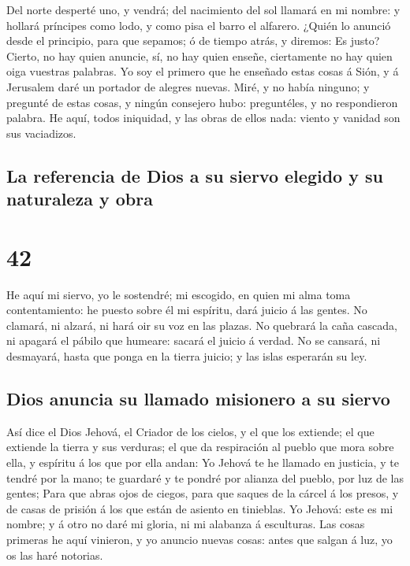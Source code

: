  Del norte desperté uno, y vendrá; del nacimiento del sol
llamará en mi nombre: y hollará príncipes como lodo, y como pisa el
barro el alfarero.  ¿Quién lo anunció desde el principio,
para que sepamos; ó de tiempo atrás, y diremos: Es justo? Cierto, no hay
quien anuncie, sí, no hay quien enseñe, ciertamente no hay quien oiga
vuestras palabras.  Yo soy el primero que he enseñado
estas cosas á Sión, y á Jerusalem daré un portador de alegres nuevas.
 Miré, y no había ninguno; y pregunté de estas cosas, y
ningún consejero hubo: preguntéles, y no respondieron palabra.
 He aquí, todos iniquidad, y las obras de ellos nada:
viento y vanidad son sus vaciadizos.

\hypertarget{la-referencia-de-dios-a-su-siervo-elegido-y-su-naturaleza-y-obra}{%
\subsection{La referencia de Dios a su siervo elegido y su naturaleza y
obra}\label{la-referencia-de-dios-a-su-siervo-elegido-y-su-naturaleza-y-obra}}

\hypertarget{section-41}{%
\section{42}\label{section-41}}

 He aquí mi siervo, yo le sostendré; mi escogido, en quien
mi alma toma contentamiento: he puesto sobre él mi espíritu, dará juicio
á las gentes.  No clamará, ni alzará, ni hará oir su voz
en las plazas.  No quebrará la caña cascada, ni apagará el
pábilo que humeare: sacará el juicio á verdad.  No se
cansará, ni desmayará, hasta que ponga en la tierra juicio; y las islas
esperarán su ley.

\hypertarget{dios-anuncia-su-llamado-misionero-a-su-siervo}{%
\subsection{Dios anuncia su llamado misionero a su
siervo}\label{dios-anuncia-su-llamado-misionero-a-su-siervo}}

 Así dice el Dios Jehová, el Criador de los cielos, y el
que los extiende; el que extiende la tierra y sus verduras; el que da
respiración al pueblo que mora sobre ella, y espíritu á los que por ella
andan:  Yo Jehová te he llamado en justicia, y te tendré
por la mano; te guardaré y te pondré por alianza del pueblo, por luz de
las gentes;  Para que abras ojos de ciegos, para que
saques de la cárcel á los presos, y de casas de prisión á los que están
de asiento en tinieblas.  Yo Jehová: este es mi nombre; y
á otro no daré mi gloria, ni mi alabanza á esculturas. 
Las cosas primeras he aquí vinieron, y yo anuncio nuevas cosas: antes
que salgan á luz, yo os las haré notorias.

